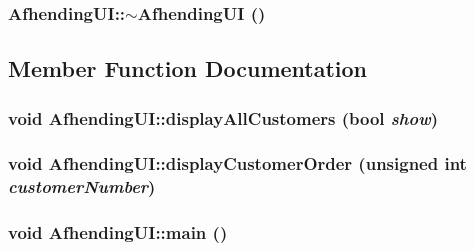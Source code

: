 \hypertarget{class_afhending_u_i_398025b0c879d72ea859f73a2af03cac}{
\subsubsection[$\sim$AfhendingUI]{\setlength{\rightskip}{0pt plus 5cm}Afhending\-UI::$\sim$Afhending\-UI ()}}
\label{class_afhending_u_i_398025b0c879d72ea859f73a2af03cac}




\subsection{Member Function Documentation}
\hypertarget{class_afhending_u_i_388ec3e6c0999970759fa9fdcacda10e}{
\subsubsection[displayAllCustomers]{\setlength{\rightskip}{0pt plus 5cm}void Afhending\-UI::display\-All\-Customers (bool {\em show})}}
\label{class_afhending_u_i_388ec3e6c0999970759fa9fdcacda10e}


\hypertarget{class_afhending_u_i_537283a7f7677384872f66c6b1dc4491}{
\subsubsection[displayCustomerOrder]{\setlength{\rightskip}{0pt plus 5cm}void Afhending\-UI::display\-Customer\-Order (unsigned int {\em customer\-Number})}}
\label{class_afhending_u_i_537283a7f7677384872f66c6b1dc4491}


\hypertarget{class_afhending_u_i_ea83b916b3f52eec32ae6d54d59b4453}{
\subsubsection[main]{\setlength{\rightskip}{0pt plus 5cm}void Afhending\-UI::main ()}}
\label{class_afhending_u_i_ea83b916b3f52eec32ae6d54d59b4453}



